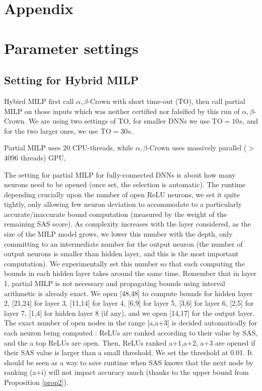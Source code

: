 \vspace{-0.6cm}

\section*{Appendix}

\section{Parameter settings}


\subsection*{Setting for Hybrid MILP}


Hybird MILP first call $\alpha,\beta$-Crown with short time-out (TO), then call partial MILP on those inputs which was neither certified nor falsified by this run of $\alpha,\beta$-Crown. We are using two settings of TO, for smaller DNNs we use TO$=10s$, and for the two larger ones, we use TO$=30s$.

Partial MILP uses 20 CPU-threads, while $\alpha,\beta$-Crown uses massively parallel ($>$4096 threads) GPU, 


The setting for partial MILP for fully-connected DNNs is about how many neurons need to be opened (once set, the selection is automatic). The runtime depending crucially upon the number of open ReLU neurons, we set it quite tightly, only allowing few neuron deviation to accommodate to a particularly accurate/inaccurate bound computation (measured by the weight of the remaining SAS score). As complexity increases with the layer considered, as the size of the MILP model grows, we lower this number with the depth, only committing to an intermediate number for the output neuron (the number of output neurons  is smaller than hidden layer, and this is the most important computation). We experimentally set this number so that each computing the bounds in each hidden layer takes around the same time. Remember that in layer 1, partial MILP is not necessary and propagating bounds using interval arithmetic is already exact. We open [48,48] to compute bounds for hidden layer 2, [21,24] for layer 3, [11,14] for layer 4, [6,9] for layer 5, [3,6] for layer 6, [2,5] for layer 7, [1,4] for hidden layer 8 (if any), and we open [14,17] for the output layer.
 The exact number of open nodes in the range [a,a+3] is decided automatically for each neuron being computed : ReLUs are ranked according to their value by SAS, and the a top ReLUs are open. Then, ReLUs ranked a+1,a+2, a+3 are opened if their SAS value is larger than a small threshold. We set the threshold at 0.01. It should be seen as a way to save runtime when SAS knows that the next node by ranking (a+i) will not impact accuracy much (thanks to the upper bound from Proposition \ref{prop2}).


